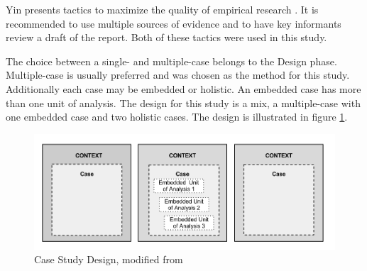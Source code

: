 
Yin presents tactics to maximize the quality of empirical research \cite{CaseStudyResearch}. It is recommended to use multiple sources of evidence and to have key informants review a draft of the report. Both of these tactics were used in this study. %



The choice between a single- and multiple-case belongs to the Design phase. Multiple-case is usually preferred and was chosen as the method for this study. Additionally each case may be embedded or holistic. An embedded case has more than one unit of analysis. The design for this study is a mix, a multiple-case with one embedded case and two holistic cases. %
The design is illustrated in figure \ref{fig:caseDesign}.

\begin{figure}[ht]
\hspace{-0.28cm}\includegraphics[scale=0.375]{caseStructure.png}
\caption[Case Design for This Study]{Case Study Design, modified from \cite{CaseStudyResearch}}
\label{fig:caseDesign}
\end{figure}

